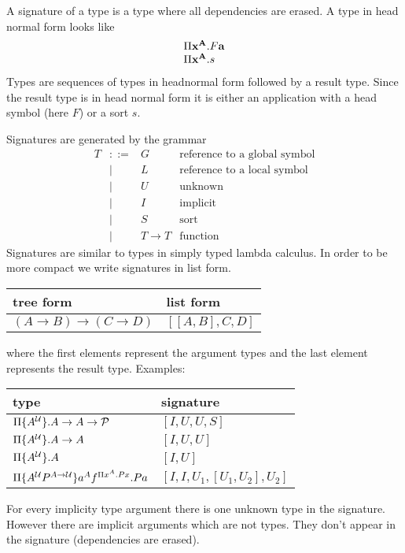 A signature of a type is a type where all dependencies are erased. A type in
head normal form looks like
$$
\begin{array}{l}
    \Pi {{\mathbf x}^{{\mathbf A}}}. F {\mathbf a}
    \\
    \Pi {{\mathbf x}^{{\mathbf A}}}. s
\end{array}
$$
Types are sequences of types in headnormal form followed by a result type. Since
the result type is in head normal form it is either an application with a head
symbol (here $F$) or a sort $s$.

Signatures are generated by the grammar
$$
\begin{array}{llll}
    T
    &::=&
    G & \text{reference to a global symbol}
    \\
      &\mid&
    L & \text{reference to a local symbol}
    \\
      &\mid&
    U & \text{unknown}
    \\
      &\mid&
    I & \text{implicit}
    \\
      &\mid&
    S & \text{sort}
    \\
      &\mid&
    T \to T & \text{function}
\end{array}
$$
Signatures are similar to types in simply typed lambda calculus. In order to be
more compact we write signatures in list form.

\begin{tabular}{|l|l|}
    \hline
    tree form & list form
    \\ \hline
    $(A \to B) \to (C \to D)$ &
    $[[A,B], C, D]$
    \\
    \hline
\end{tabular}

where the first elements represent the argument types and the last element
represents the result type.
%
Examples:

\begin{tabular}{|l|l|}
    \hline
    type & signature
    \\ \hline
    $\Pi {\{A^{\cal U}\}}. A \to A \to {\cal P}$ &
    $[I, U, U, S]$
    \\
    $\Pi {\{A^{\cal U}\}}. A \to A$ &
    $[I, U, U]$
    \\
    $\Pi {\{A^{\cal U}\}}. A$ &
    $[I, U]$
    \\
    $\Pi {\{A^{\cal U}P^{A \to {\cal U}}\}} a^A f^{\Pi x^A. P x}. P a$ &
    $[I, I, U_1, [U_1, U_2], U_2]$
    \\
    \hline
\end{tabular}

For every implicity type argument there is one unknown type in the signature.
However there are implicit arguments which are not types. They don't appear in
the signature (dependencies are erased).

